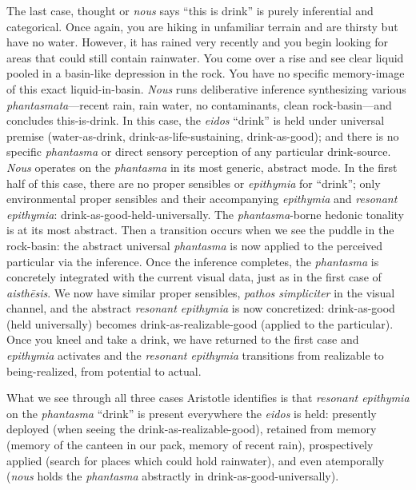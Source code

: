 The last case, thought or \textit{nous} says ``this is drink'' is purely inferential and categorical. Once again, you are hiking in unfamiliar terrain and are thirsty but have no water. However, it has rained very recently and you begin looking for areas that could still contain rainwater. You come over a rise and see clear liquid pooled in a basin-like depression in the rock. You have no specific memory-image of this exact liquid-in-basin. \textit{Nous} runs deliberative inference synthesizing various \textit{phantasmata}---recent rain, rain water, no contaminants, clean rock-basin---and concludes this-is-drink. In this case, the \textit{eidos} ``drink'' is held under universal premise (water-as-drink, drink-as-life-sustaining, drink-as-good); and there is no specific \textit{phantasma} or direct sensory perception of any particular drink-source. \textit{Nous} operates on the \textit{phantasma} in its most generic, abstract mode. In the first half of this case, there are no proper sensibles or \textit{epithymia} for ``drink''; only environmental proper sensibles and their accompanying \textit{epithymia} and \textit{resonant epithymia}: drink-as-good-held-universally. The \textit{phantasma}-borne hedonic tonality is at its most abstract. Then a transition occurs when we see the puddle in the rock-basin: the abstract universal \textit{phantasma} is now applied to the perceived particular via the inference. Once the inference completes, the \textit{phantasma} is concretely integrated with the current visual data, just as in the first case of \textit{aisthēsis}. We now have similar proper sensibles, \textit{pathos simpliciter} in the visual channel, and the abstract \textit{resonant epithymia} is now concretized: drink-as-good (held universally) becomes drink-as-realizable-good (applied to the particular). Once you kneel and take a drink, we have returned to the first case and \textit{epithymia} activates and the \textit{resonant epithymia} transitions from realizable to being-realized, from potential to actual. 

What we see through all three cases Aristotle identifies is that \textit{resonant epithymia} on the \textit{phantasma} ``drink'' is present everywhere the \textit{eidos} is held: presently deployed (when seeing the drink-as-realizable-good), retained from memory (memory of the canteen in our pack, memory of recent rain), prospectively applied (search for places which could hold rainwater), and even atemporally (\textit{nous} holds the \textit{phantasma} abstractly in drink-as-good-universally). 

